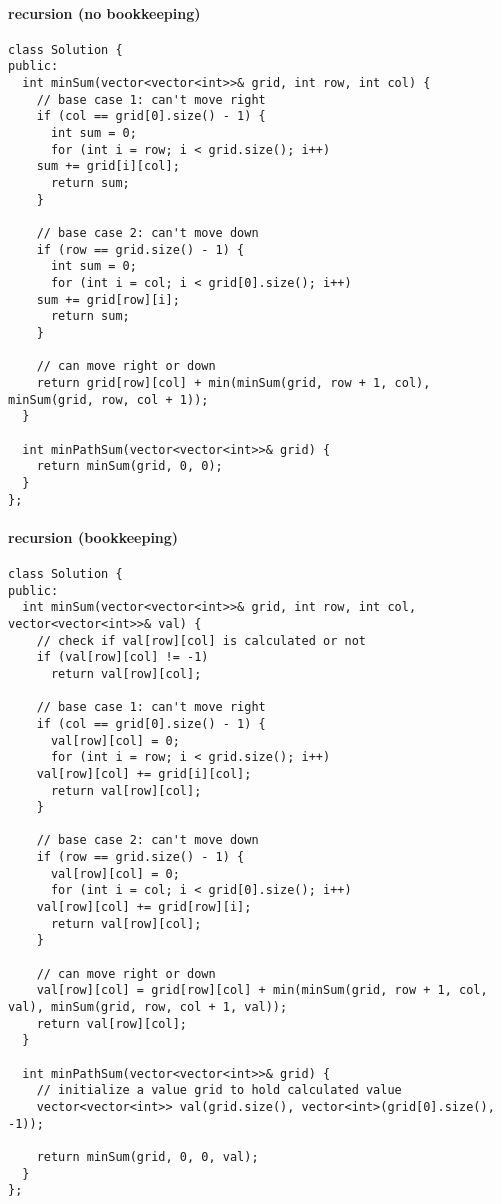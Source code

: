 \documentclass[11pt]{article}
\begin{document}
\paragraph{recursion (no bookkeeping)}
\label{sec:orgbd78d6d}
\begin{verbatim}
class Solution {
public:
  int minSum(vector<vector<int>>& grid, int row, int col) {
    // base case 1: can't move right
    if (col == grid[0].size() - 1) {
      int sum = 0;
      for (int i = row; i < grid.size(); i++)
	sum += grid[i][col];
      return sum;
    }

    // base case 2: can't move down
    if (row == grid.size() - 1) {
      int sum = 0;
      for (int i = col; i < grid[0].size(); i++)
	sum += grid[row][i];
      return sum;
    }

    // can move right or down 
    return grid[row][col] + min(minSum(grid, row + 1, col), minSum(grid, row, col + 1));
  }

  int minPathSum(vector<vector<int>>& grid) {
    return minSum(grid, 0, 0);
  }
};
\end{verbatim}
\paragraph{recursion (bookkeeping)}
\label{sec:orgc009784}
\begin{verbatim}
class Solution {
public:
  int minSum(vector<vector<int>>& grid, int row, int col, vector<vector<int>>& val) {
    // check if val[row][col] is calculated or not
    if (val[row][col] != -1)
      return val[row][col];

    // base case 1: can't move right
    if (col == grid[0].size() - 1) {
      val[row][col] = 0;
      for (int i = row; i < grid.size(); i++)
	val[row][col] += grid[i][col];      
      return val[row][col];
    }

    // base case 2: can't move down
    if (row == grid.size() - 1) {
      val[row][col] = 0;
      for (int i = col; i < grid[0].size(); i++)
	val[row][col] += grid[row][i];
      return val[row][col];
    }

    // can move right or down
    val[row][col] = grid[row][col] + min(minSum(grid, row + 1, col, val), minSum(grid, row, col + 1, val));
    return val[row][col];
  }

  int minPathSum(vector<vector<int>>& grid) {
    // initialize a value grid to hold calculated value
    vector<vector<int>> val(grid.size(), vector<int>(grid[0].size(), -1));

    return minSum(grid, 0, 0, val);
  }
};
\end{verbatim}
\end{document}
